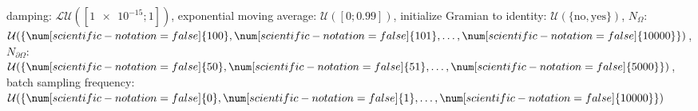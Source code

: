 damping: $\mathcal{LU}([\num[scientific-notation=true]{1e-15}; \num[scientific-notation=false]{1}])$, exponential moving average: $\mathcal{U}([\num[scientific-notation=false]{0}; \num[scientific-notation=true]{0.99}])$, initialize Gramian to identity: $\mathcal{U}(\{\text{no},\text{yes}\})$, $N_{\Omega}$: $\mathcal{U}(\{\num[scientific-notation=false]{100},\num[scientific-notation=false]{101},\text{\dots},\num[scientific-notation=false]{10000}\})$, $N_{\partial\Omega}$: $\mathcal{U}(\{\num[scientific-notation=false]{50},\num[scientific-notation=false]{51},\text{\dots},\num[scientific-notation=false]{5000}\})$, batch sampling frequency: $\mathcal{U}(\{\num[scientific-notation=false]{0},\num[scientific-notation=false]{1},\text{\dots},\num[scientific-notation=false]{10000}\})$